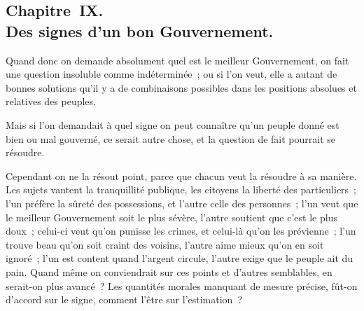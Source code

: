 \documentclass[french,twoside]{book} %
\begin{document}
\subsection[{Chapitre IX. Des signes d’un bon Gouvernement.}]{Chapitre IX. \\
Des signes d’un bon Gouvernement.}
\noindent Quand donc on demande absolument quel est le meilleur Gouvernement, on fait une question insoluble comme indéterminée ; ou si l’on veut, elle a autant de bonnes solutions qu’il y a de combinaisons possibles dans les positions absolues et relatives des peuples.\par
Mais si l’on demandait à quel signe on peut connaître qu’un peuple donné est bien ou mal gouverné, ce serait autre chose, et la question de fait pourrait se résoudre.\par
Cependant on ne la résout point, parce que chacun veut la résoudre à sa manière. Les sujets vantent la tranquillité publique, les citoyens la liberté des particuliers ; l’un préfère la sûreté des possessions, et l’autre celle des personnes ; l’un veut que le meilleur Gouvernement soit le plus sévère, l’autre soutient que c’est le plus doux ; celui-ci veut qu’on punisse les crimes, et celui-là qu’on les prévienne ; l’un trouve beau qu’on soit craint des voisins, l’autre aime mieux qu’on en soit ignoré ; l’un est content quand l’argent circule, l’autre exige que le peuple ait du pain. Quand même on conviendrait sur ces points et d’autres semblables, en serait-on plus avancé ? Les quantités morales manquant de mesure précise, fût-on d’accord sur le signe, comment l’être sur l’estimation ?\par
\end{document}
